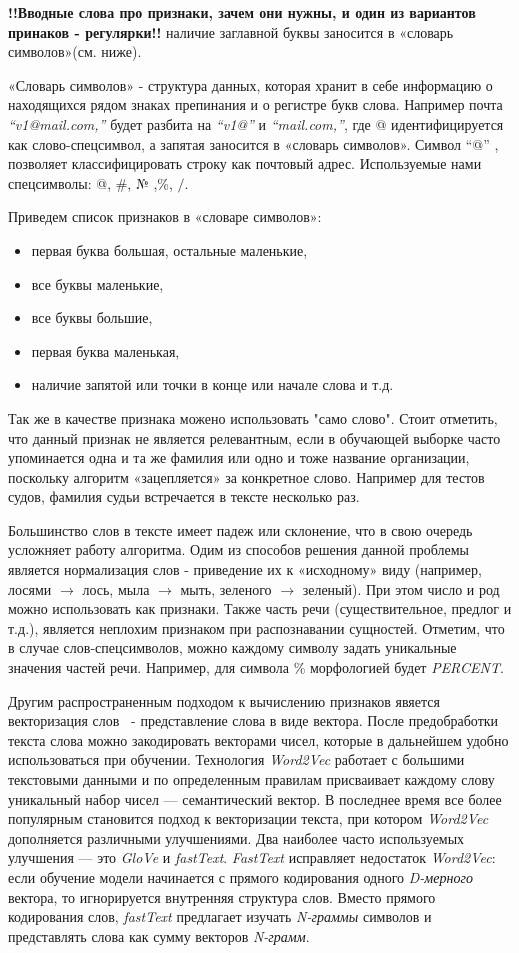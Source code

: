 \documentclass{csmathnotes}
\begin{document}
{\bf!!Вводные слова про признаки, зачем они нужны, и один из вариантов принаков - регулярки!!}
{наличие заглавной буквы заносится в «словарь символов»(см. ниже).}

«Словарь символов» - структура данных, которая хранит в себе информацию о находящихся рядом знаках препинания и о регистре букв слова.
Например почта \emph{“v1@mail.com,”} будет разбита на \emph{“v1@”} и \emph{“mail.com,”}, где @ идентифицируется как слово-спецсимвол, а запятая заносится в «словарь символов». Символ “@” , позволяет классифицировать строку как почтовый адрес. Используемые нами спецсимволы: @, \#, № ,\%, $/$.


Приведем список признаков в «словаре символов»:
\begin{itemize}
    \item первая буква большая, остальные маленькие,
    \item все буквы маленькие,
    \item все буквы большие,
    \item первая буква маленькая,
    \item наличие запятой или точки в конце или начале слова и т.д.
\end{itemize}


Так же в качестве признака можено использовать "само слово". Стоит отметить, что данный признак не является релевантным, если в обучающей выборке часто упоминается одна и та же фамилия или одно и тоже название организации, поскольку алгоритм «зацепляется» за конкретное слово.
Например для тестов судов, фамилия судьи встречается в тексте несколько раз.


Большинство слов в тексте имеет падеж или склонение, что в свою очередь усложняет работу алгоритма.
Одим из способов решения данной проблемы является нормализация слов - приведение их к «исходному» виду
(например, лосями $\rightarrow$  лось, мыла $\rightarrow$ мыть, зеленого $\rightarrow$ зеленый).
При этом число и род можно использовать как признаки.
Также часть речи (существительное, предлог и т.д.), является неплохим признаком при распознавании сущностей.
Отметим, что в случае слов-спецсимволов, можно каждому символу задать уникальные значения частей речи.
Например, для символа \% морфологией будет \emph{PERCENT}.

 
Другим распространенным подходом к вычислению признаков явяется векторизация слов~\cite{w2v} -  представление слова в виде вектора.
После предобработки текста слова можно закодировать векторами чисел, которые в дальнейшем удобно использоваться при обучении.
Технология \emph{Word2Vec} работает с большими текстовыми данными и по определенным правилам присваивает каждому слову уникальный набор чисел — семантический вектор. В последнее время все более популярным становится подход к векторизации текста, при котором \emph{Word2Vec} дополняется различными улучшениями. Два наиболее часто используемых улучшения — это \emph{GloVe} и \emph{fastText}. \emph{FastText} исправляет недостаток \emph{Word2Vec}: если обучение модели начинается с прямого кодирования одного \emph{D-мерного} вектора, то игнорируется внутренняя структура слов. Вместо прямого кодирования слов, \emph{fastText} предлагает изучать \emph{N-граммы} символов и представлять слова как сумму векторов \emph{N-грамм}.
\end{document}

